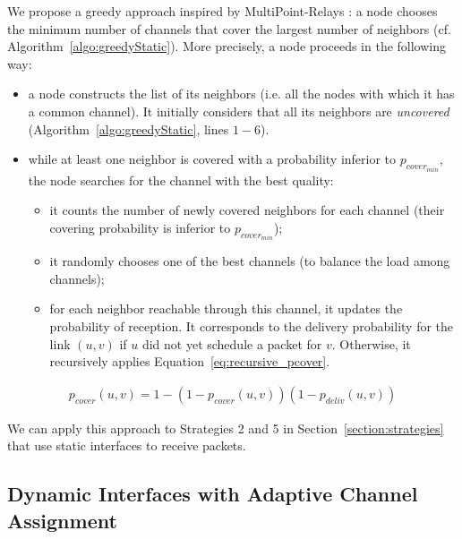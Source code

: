 \documentclass[twoside]{article}
\begin{document}
We propose a greedy approach inspired by MultiPoint-Relays \cite{MPR}: a node
chooses the minimum number of channels that cover the largest number of
neighbors (cf. Algorithm~\ref{algo:greedyStatic}).  
More precisely, a node proceeds in the following way:
\begin{itemize}
	\item a node constructs the list of its neighbors (i.e. all the nodes with which it has a common channel). 
	It initially considers that all its neighbors are \emph{uncovered} (Algorithm~\ref{algo:greedyStatic}, lines $1-6$).  
	
	\item while at least one neighbor is covered with a probability inferior
          to $p_{cover_{min}}$, the node searches for the channel with the best quality:
	\begin{itemize}
		\item it counts the number of newly covered neighbors for each channel (their covering probability is inferior to $p_{cover_{min}}$);
		\item it randomly chooses one of the best channels (to balance the load among channels);
		
		\item for each neighbor reachable through this channel, it updates the probability of reception.
		It corresponds to the delivery probability for the link $(u,v)$ if $u$ did not yet schedule a packet for $v$. Otherwise, it recursively applies Equation~\ref{eq:recursive_pcover}. 
	\end{itemize}	
\end{itemize}
\begin{eqnarray}
	p_{cover} (u,v) = 1 - \left(1 - p_{cover} (u,v)\right) \left(1- p_{deliv}(u,v) \right)
	\label{eq:recursive_pcover}
\end{eqnarray}

We can apply this approach to Strategies 2 and 5 in Section~\ref{section:strategies} that use static interfaces to receive packets.  




\subsection{Dynamic Interfaces with Adaptive Channel Assignment}
\end{document}
